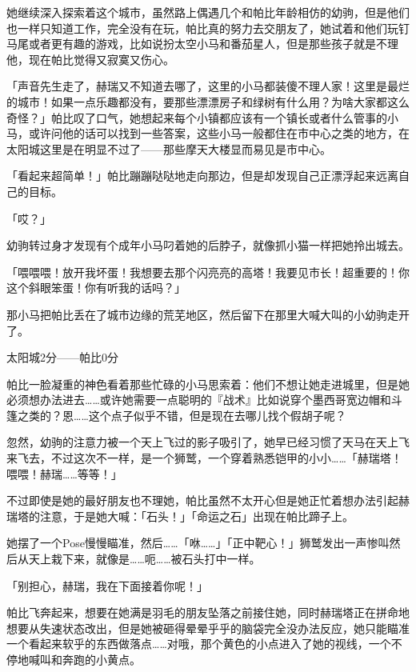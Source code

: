 她继续深入探索着这个城市，虽然路上偶遇几个和帕比年龄相仿的幼驹，但是他们也一样只知道工作，完全没有在玩，帕比真的努力去交朋友了，她试着和他们玩钉马尾或者更有趣的游戏，比如说扮太空小马和番茄星人，但是那些孩子就是不理他，现在帕比觉得又寂寞又伤心。

「声音先生走了，赫瑞又不知道去哪了，这里的小马都装傻不理人家！这里是最烂的城市！如果一点乐趣都没有，要那些漂漂房子和绿树有什么用？为啥大家都这么奇怪？」帕比叹了口气，她想起来每个小镇都应该有一个镇长或者什么管事的小马，或许问他的话可以找到一些答案，这些小马一般都住在市中心之类的地方，在太阳城这里是在明显不过了——那些摩天大楼显而易见是市中心。

「看起来超简单！」帕比蹦蹦哒哒地走向那边，但是却发现自己正漂浮起来远离自己的目标。

「哎？」

幼驹转过身才发现有个成年小马叼着她的后脖子，就像抓小猫一样把她拎出城去。

「喂喂喂！放开我坏蛋！我想要去那个闪亮亮的高塔！我要见市长！超重要的！你这个斜眼笨蛋！你有听我的话吗？」

那小马把帕比丢在了城市边缘的荒芜地区，然后留下在那里大喊大叫的小幼驹走开了。

\begin{center}
太阳城2分——帕比0分
\end{center}


\horizonline


帕比一脸凝重的神色看着那些忙碌的小马思索着：他们不想让她走进城里，但是她必须想办法进去……或许她需要一点聪明的『战术』比如说穿个墨西哥宽边帽和斗篷之类的？恩……这个点子似乎不错，但是现在去哪儿找个假胡子呢？

忽然，幼驹的注意力被一个天上飞过的影子吸引了，她早已经习惯了天马在天上飞来飞去，不过这次不一样，是一个狮鹫，一个穿着熟悉铠甲的小小……「赫瑞塔！喂喂！赫瑞……等等！」

不过即使是她的最好朋友也不理她，帕比虽然不太开心但是她正忙着想办法引起赫瑞塔的注意，于是她大喊：「石头！」「命运之石」出现在帕比蹄子上。

她摆了一个Pose慢慢瞄准，然后……「咻……」「正中靶心！」狮鹫发出一声惨叫然后从天上栽下来，就像是……呃……被石头打中一样。

「别担心，赫瑞，我在下面接着你呢！」

帕比飞奔起来，想要在她满是羽毛的朋友坠落之前接住她，同时赫瑞塔正在拼命地想要从失速状态改出，但是她被砸得晕晕乎乎的脑袋完全没办法反应，她只能瞄准一个看起来软乎的东西做落点……对哦，那个黄色的小点进入了她的视线，一个不停地喊叫和奔跑的小黄点。

